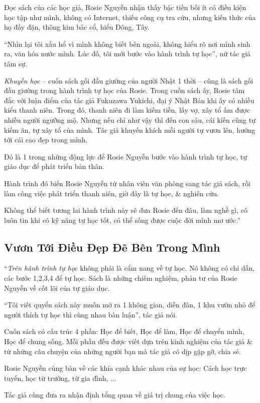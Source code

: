 \documentclass[oneside]{book}
\numberwithin{equation}{section}
\begin{document}
Đọc sách của các học giả, Rosie Nguyễn nhận thấy bậc tiền bối ít có điều kiện học tập như mình, không có Internet, thiếu công cụ tra cứu, nhưng kiến thức của họ đầy đặn, thông kim bác cổ, hiểu Đông, Tây.

``Nhìn lại tôi xấu hổ vì mình không biết bên ngoài, không hiểu rõ nơi mình sinh ra, văn hóa nước mình. Lúc đố, tôi mới bước vào hành trình tự học'', nữ tác giả tâm sự.

\textit{Khuyến học} -- cuốn sách gối đầu giường của người Nhật 1 thời -- cũng là sách gối đầu giường trong hành trình tự học của Rosie. Trong cuốn sách ấy, Rosie tâm đắc với luận điểm của tác giả Fukuzawa Yukichi, đại ý Nhật Bản khi ấy có nhiều kiểu thanh niên. Trong đó, thanh niên đi làm kiếm tiền, lấy vợ, xây tổ ấm được nhiều người ngưỡng mộ. Nhưng nếu chỉ như vậy thì đến con sâu, cái kiến cũng tự kiếm ăn, tự xây tổ của mình. Tác giả khuyến khích mỗi người tự vươn lên, hướng tới cái cao đẹp trong mình.

Đó là 1 trong những động lực để Rosie Nguyễn bước vào hành trình tự học, tự giáo dục để phát triển bản thân.

Hành trình đó biến Rosie Nguyễn từ nhân viên văn phòng sang tác giả sách, rồi làm công việc phát triển thanh niên, giờ đây là tự học, \& nghiên cứu.

Không thể biết tương lai hành trình này sẽ đưa Rosie đến đâu, làm nghề gì, cô luôn tin khi có kỹ năng tự học tốt, có thể sống được cuộc đời mình mơ ước.''

\subsection{Vươn Tới Điều Đẹp Đẽ Bên Trong Mình}
``\textit{Trên hành trình tự học} không phải là cẩm nang về tự học. Nó không có chỉ dẫn, các bước 1,2,3,4 để tự học. Sách là những chiêm nghiệm, phản tư của Rosie Nguyễn về cốt lõi của tự giáo dục.

``Tôi viết quyển sách này muốn mở ra 1 không gian, diễn đàn, 1 khu vườn nhỏ để người thích tự học thì cùng nhau bàn luận'', tác giả nói.

Cuốn sách có cấu trúc 4 phần: Học để biết, Học để làm, Học để chuyển mình, Học để chung sống. Mỗi phần đều được viết dựa trên kinh nghiệm của tác giả \& từ những câu chuyện của những người bạn mà tác giả có dịp gặp gỡ, chia sẻ.

Rosie Nguyễn cùng bàn về các khía cạnh khác nhau của sự học: Cách học trực tuyến, học từ trường, từ gia đình, $\ldots$

Tác giả cùng đưa ra nhận định tổng quan về giá trị chung của việc học.
\end{document}
